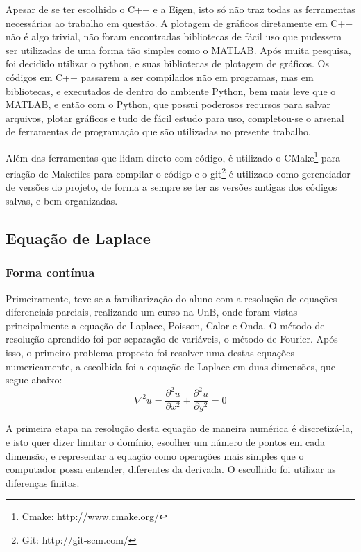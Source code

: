\documentclass[journal]{IEEEtran}
\begin{document}
Apesar de se ter escolhido o C++ e a Eigen, isto só não traz todas as ferramentas necessárias ao trabalho em questão. A plotagem de gráficos diretamente em C++ não é algo trivial, não foram encontradas bibliotecas de fácil uso que pudessem ser utilizadas de uma forma tão simples como o MATLAB. Após muita pesquisa, foi decidido utilizar o python, e suas bibliotecas de plotagem de gráficos. Os códigos em C++ passarem a ser compilados não em programas, mas em bibliotecas, e executados de dentro do ambiente Python, bem mais leve que o MATLAB, e então com o Python, que possui poderosos recursos para salvar arquivos, plotar gráficos e tudo de fácil estudo para uso, completou-se o arsenal de ferramentas de programação que são utilizadas no presente trabalho.

Além das ferramentas que lidam direto com código, é utilizado o CMake\footnote{Cmake: http://www.cmake.org/} para criação de Makefiles para compilar o código e o git\footnote{Git: http://git-scm.com/} é utilizado como gerenciador de versões do projeto, de forma a sempre se ter as versões antigas dos códigos salvas, e bem organizadas.
\subsection{Equação de Laplace}
\subsubsection{Forma contínua}
Primeiramente, teve-se a familiarização do aluno com a resolução de equações diferenciais parciais, realizando um curso na UnB, onde foram vistas principalmente a equação de Laplace, Poisson, Calor e Onda. O método de resolução aprendido foi por separação de variáveis, o método de Fourier. Após isso, o primeiro problema proposto foi resolver uma destas equações numericamente, a escolhida foi a equação de Laplace em duas dimensões, que segue abaixo:
\begin{equation}
\nabla^2 u=\frac{\partial^2 u}{\partial x^2}+\frac{\partial^2 u}{\partial y^2}=0\label{laplace}
\end{equation}

A primeira etapa na resolução desta equação de maneira numérica é discretizá-la, e isto quer dizer limitar o domínio, escolher um número de pontos em cada dimensão, e representar a equação como operações mais simples que o computador possa entender, diferentes da derivada. O escolhido foi utilizar as diferenças finitas.
\end{document}
